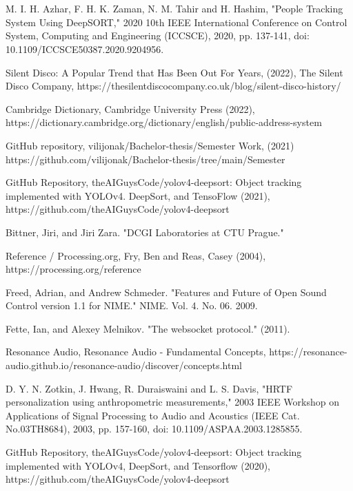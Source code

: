 \documentclass{ctuthesis}
\begin{document}
\section{}

\begin{thebibliography}{1}

  M. I. H. Azhar, F. H. K. Zaman, N. M. Tahir and H. Hashim, "People Tracking System Using DeepSORT," 2020 10th IEEE International Conference on Control System, Computing and Engineering (ICCSCE), 2020, pp. 137-141, doi: 10.1109/ICCSCE50387.2020.9204956.

  Silent Disco: A Popular Trend that Has Been Out For Years, (2022), The Silent Disco Company, https://thesilentdiscocompany.co.uk/blog/silent-disco-history/
 
  Cambridge Dictionary, Cambridge University Press (2022), https://dictionary.cambridge.org/dictionary/english/public-address-system
 
  GitHub repository, vilijonak/Bachelor-thesis/Semester Work, (2021) https://github.com/vilijonak/Bachelor-thesis/tree/main/Semester%
 
  GitHub Repository, theAIGuysCode/yolov4-deepsort: Object tracking implemented with YOLOv4. DeepSort, and TensoFlow (2021), https://github.com/theAIGuysCode/yolov4-deepsort

 Bittner, Jiri, and Jiri Zara. "DCGI Laboratories at CTU Prague."

 Reference / Processing.org, Fry, Ben and Reas, Casey (2004), https://processing.org/reference 

 Freed, Adrian, and Andrew Schmeder. "Features and Future of Open Sound Control version 1.1 for NIME." NIME. Vol. 4. No. 06. 2009.

 Fette, Ian, and Alexey Melnikov. "The websocket protocol." (2011).

 Resonance Audio, Resonance Audio - Fundamental Concepts, https://resonance-audio.github.io/resonance-audio/discover/concepts.html

 D. Y. N. Zotkin, J. Hwang, R. Duraiswaini and L. S. Davis, "HRTF personalization using anthropometric measurements," 2003 IEEE Workshop on Applications of Signal Processing to Audio and Acoustics (IEEE Cat. No.03TH8684), 2003, pp. 157-160, doi: 10.1109/ASPAA.2003.1285855.

 GitHub Repository, theAIGuysCode/yolov4-deepsort: Object tracking implemented with YOLOv4, DeepSort, and Tensorflow (2020), https://github.com/theAIGuysCode/yolov4-deepsort


\end{thebibliography}
\end{document}
